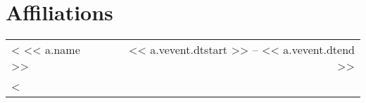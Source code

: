 \section{Affiliations}

\begin{tabularx}{0.97\linewidth}{Xr}
<%
<< a.name >> & << a.vevent.dtstart >> -- << a.vevent.dtend >> \\
<%
\end{tabularx}

